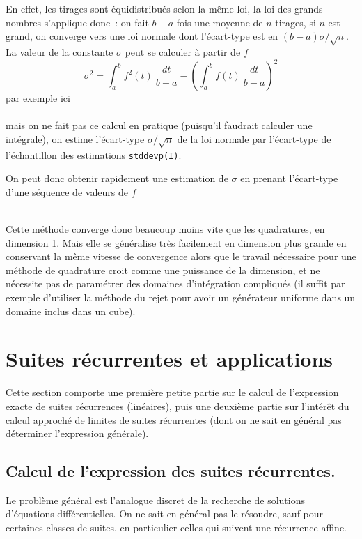 \documentclass[a4paper,11pt]{book}
\begin{document}
\begin{giacjshere}
En effet, les tirages sont \'equidistribu\'es selon la m\^eme loi,
la loi des grands nombres s'applique donc~: on fait $b-a$ fois
une moyenne de
$n$ tirages, si $n$ est grand, on converge vers une loi normale
dont l'\'ecart-type est en $(b-a)\sigma/\sqrt{n}$.
La valeur de la constante $\sigma$
peut se calculer \`a partir de $f$
$$ \sigma^2 = \int_a^b f^2(t) \ \frac{dt}{b-a} -
\left( \int_a^b f(t) \ \frac{dt}{b-a}  \right)^2 $$
par exemple ici\\
\\
mais on ne fait pas ce calcul en pratique
(puisqu'il faudrait calculer une int\'egrale), on estime
l'\'ecart-type $\sigma/\sqrt{n}$ de la loi normale par
l'\'ecart-type de l'\'echantillon des estimations \verb|stddevp(I)|.\\

On peut donc obtenir rapidement une estimation de $\sigma$ en prenant
l'\'ecart-type d'une s\'equence de valeurs de $f$\\
\\

Cette m\'ethode converge donc beaucoup moins vite que les quadratures,
en dimension 1. Mais elle se g\'en\'eralise tr\`es facilement en
dimension plus grande en conservant la m\^eme vitesse de convergence
alors que le travail n\'ecessaire pour une m\'ethode de quadrature
croit comme une puissance de la dimension, et ne n\'ecessite pas
de param\'etrer des domaines d'int\'egration compliqu\'es  (il suffit
par exemple d'utiliser la m\'ethode du rejet pour avoir un
g\'en\'erateur uniforme
dans un domaine inclus dans un cube).


\chapter{Suites récurrentes et applications} \label{sec:rec}
Cette section comporte une première petite partie sur le calcul
de l'expression exacte de suites récurrences (linéaires), puis
une deuxième partie sur l'intérêt du calcul approché de limites
de suites récurrentes (dont on ne sait en général pas déterminer l'expression
générale).

\section{Calcul de l'expression des suites récurrentes.}
Le problème général est l'analogue discret de la recherche de solutions
d'équations différentielles. On ne sait en général pas le résoudre, sauf
pour certaines classes de suites, en particulier celles qui suivent
une récurrence affine.


\end{giacjshere}
\end{document}
